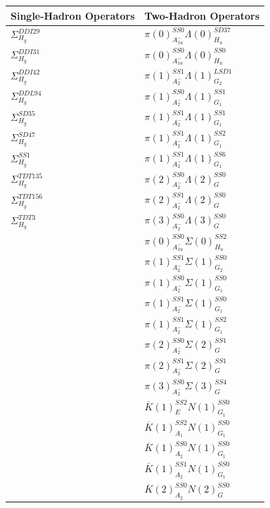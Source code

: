 \begin{longtable}{l|l}
        \textbf{Single-Hadron Operators} & \textbf{Two-Hadron Operators} \\
        \hline
        $\Sigma_{H_g}^{DDI29}$ & $\pi(0)_{A_{1u}^-}^{SS0}\Lambda(0)_{H_u}^{SD37}$\\
        $\Sigma_{H_g}^{DDI31}$ & $\pi(0)_{A_{1u}^-}^{SS0}\Lambda(0)_{H_u}^{SS0}$\\
        $\Sigma_{H_g}^{DDI42}$ & $\pi(1)_{A_2^-}^{SS1}\Lambda(1)_{G_2}^{LSD1}$\\
        $\Sigma_{H_g}^{DDL94}$ & $\pi(1)_{A_2^-}^{SS0}\Lambda(1)_{G_1}^{SS1}$\\
        $\Sigma_{H_g}^{SD35}$ & $\pi(1)_{A_2^-}^{SS1}\Lambda(1)_{G_1}^{SS1}$\\
        $\Sigma_{H_g}^{SD47}$ & $\pi(1)_{A_2^-}^{SS1}\Lambda(1)_{G_1}^{SS2}$\\
        $\Sigma_{H_g}^{SS1}$ & $\pi(1)_{A_2^-}^{SS1}\Lambda(1)_{G_1}^{SS6}$\\
        $\Sigma_{H_g}^{TDT135}$ & $\pi(2)_{A_2^-}^{SS0}\Lambda(2)_{G}^{SS0}$\\
        $\Sigma_{H_g}^{TDT156}$ & $\pi(2)_{A_2^-}^{SS1}\Lambda(2)_{G}^{SS0}$\\
        $\Sigma_{H_g}^{TDT3}$ & $\pi(3)_{A_2^-}^{SS0}\Lambda(3)_{G}^{SS0}$\\
         & $\pi(0)_{A_{1u}^-}^{SS0}\Sigma(0)_{H_u}^{SS2}$\\
         & $\pi(1)_{A_2^-}^{SS1}\Sigma(1)_{G_2}^{SS0}$\\
         & $\pi(1)_{A_2^-}^{SS0}\Sigma(1)_{G_1}^{SS0}$\\
         & $\pi(1)_{A_2^-}^{SS1}\Sigma(1)_{G_1}^{SS0}$\\
         & $\pi(1)_{A_2^-}^{SS1}\Sigma(1)_{G_1}^{SS2}$\\
         & $\pi(2)_{A_2^-}^{SS0}\Sigma(2)_{G}^{SS1}$\\
         & $\pi(2)_{A_2^-}^{SS1}\Sigma(2)_{G}^{SS1}$\\
         & $\pi(3)_{A_2^-}^{SS0}\Sigma(3)_{G}^{SS4}$\\
         & $\overline K(1)_{E}^{SS2}N(1)_{G_1}^{SS0}$\\
         & $\overline K(1)_{A_1}^{SS2}N(1)_{G_1}^{SS0}$\\
         & $\overline K(1)_{A_2}^{SS0}N(1)_{G_1}^{SS0}$\\
         & $\overline K(1)_{A_2}^{SS1}N(1)_{G_1}^{SS0}$\\
         & $\overline K(2)_{A_2}^{SS0}N(2)_{G}^{SS0}$\\

\end{longtable}
